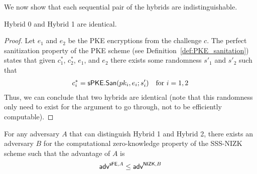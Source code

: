 \documentclass{llncs}
\begin{document}
We now show that each sequential pair of the hybrids are indistinguishable.

\begin{claim} \label{claim:sFE_san_PKE}
Hybrid 0 and Hybrid 1 are identical.
\end{claim}

\begin{proof}
Let $e_1$ and $e_2$ be the PKE encryptions from the challenge $c$. The perfect sanitization property of the PKE scheme (see Definition~\ref{def:PKE_sanitation}) states that given $c^*_1$, $c^*_2$, $e_1$, and $e_2$ there exists some randomness $s'_1$ and $s'_2$ such that
	\begin{align*}
	c^*_i = \mathsf{sPKE}.\mathsf{San}(pk_i,e_i;s'_i) \quad \text{for } i=1,2
	\end{align*}
Thus, we can conclude that two hybrids are identical (note that this randomness only need to exist for the argument to go through, not to be efficiently computable). 
\end{proof}


\begin{claim} \label{claim:sFE_san_ZK_1}
For any adversary $A$ that can distinguish Hybrid 1 and Hybrid 2, there exists an adversary $B$ for the computational zero-knowledge property of the SSS-NIZK scheme such that the advantage of $A$ is 
\begin{align*}
	\mathsf{adv}^{\mathsf{sFE},A} \leq \mathsf{adv}^{\mathsf{NIZK},B} 
\end{align*}
\end{claim}
\end{document}
